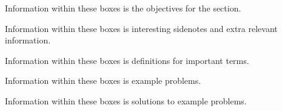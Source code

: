 \documentclass[11pt]{exam}
\begin{document}
\begin{center}  
\end{center}
\vspace{22pt}
\begin{tcolorbox}[objective]
    Information within these boxes is the objectives for the section.
\end{tcolorbox}
\vspace{22pt}
\begin{tcolorbox}[interesting]
    Information within these boxes is interesting sidenotes and extra relevant information.
\end{tcolorbox}
\vspace{22pt}
\begin{tcolorbox}[definition]
    Information within these boxes is definitions for important terms.
\end{tcolorbox}
\vspace{22pt}
\begin{tcolorbox}[example]
    Information within these boxes is example problems.
\end{tcolorbox}
\vspace{22pt}
\begin{tcolorbox}[solution]
    Information within these boxes is solutions to example problems.    
\end{tcolorbox}


\def\inputpathChapterOne{Chapter1/}


\newpage

\def\inputpathChapterTwo{Chapter2/}

\end{document}
